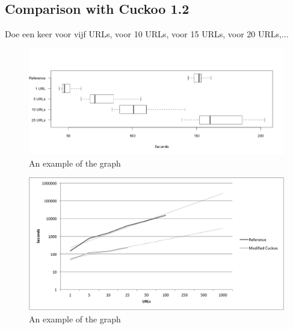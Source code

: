 \pagebreak

\restoregeometry
{}
\setcounter{page}{\thesavepage}

\subsection{Comparison with Cuckoo 1.2}

Doe een keer voor vijf URLs, voor 10 URLs, voor 15 URLs, voor 20 URLs,...


\begin{figure}[h]
    \centering
    \centerline{\includegraphics[width=20cm]{Images/chart-box.png}}
    \caption{An example of the graph}
    \label{fig:chart-box}
\end{figure}

\begin{figure}[h]
    \centering
    \centerline{\includegraphics[width=20cm]{Images/chart-trend}}
    \caption{An example of the graph}
    \label{fig:chart-trend}
\end{figure}
